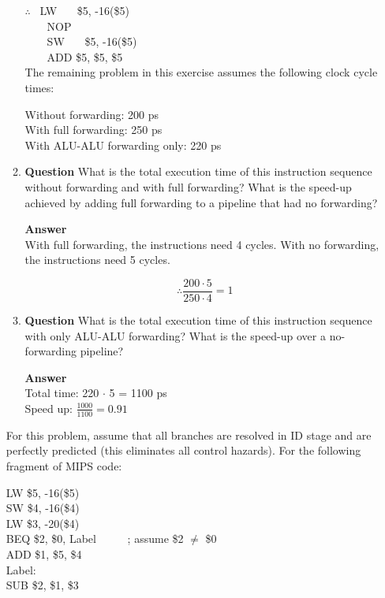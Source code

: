 \documentclass[paper=usletter, fontsize=12pt]{article}
\begin{document}
\begin{enumerate}
\begin{enumerate}
            $\therefore$ \nolinebreak
                \ LW \ \ \ \$5, -16(\$5) \\
                \indent  \ \ \ \  NOP \\
                \indent  \ \ \ \  SW \ \ \ \$5, -16(\$5) \\
                \indent  \ \ \ \ ADD \$5, \$5, \$5 \\


            The remaining problem in this exercise assumes the following clock cycle times:

            Without forwarding: 200 ps \\
            With full forwarding: 250 ps \\
            With ALU-ALU forwarding only: 220 ps \\

            \item \textbf{Question}
            What is the total execution time of this instruction sequence without forwarding and with full forwarding? What is the speed-up achieved by adding full forwarding to a pipeline that had no forwarding?

            \textbf{Answer} \\
            With full forwarding, the instructions need 4 cycles. With no forwarding, the instructions need 5 cycles.

                \[ \therefore \frac{200\cdot5}{250\cdot4}=1 \]

            \item \textbf{Question}
            What is the total execution time of this instruction sequence with only ALU-ALU forwarding? What is the speed-up over a no-forwarding pipeline?

            \textbf{Answer} \\
            Total time: 220 $\cdot$ 5 = 1100 ps \\
            Speed up: $\frac{1000}{1100}=0.91$

        \end{enumerate}

            For this problem, assume that all branches are resolved in ID stage and are perfectly predicted (this eliminates all control hazards). For the following fragment of MIPS code:

            LW \$5, -16(\$5) \\
            SW \$4, -16(\$4) \\
            LW \$3, -20(\$4) \\
            BEQ \$2, \$0, Label \ \ \ \ \ ; assume \$2 $\neq$ \$0 \\
            ADD \$1, \$5, \$4 \\
            Label: \\
            SUB \$2, \$1, \$3 \\
            

\end{enumerate}
\end{document}
